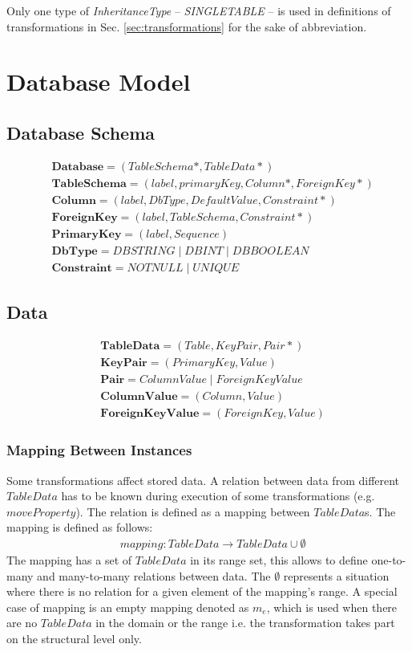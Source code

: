 \documentclass[10pt]{article}
\begin{document}
Only one type of \emph{InheritanceType} -- \emph{SINGLETABLE} -- is used in definitions of transformations in Sec. \ref{sec:transformations} for the sake of abbreviation. 


\section{Database Model}
\subsection{Database Schema}
\begin{align}
&	\mathbf{Database} = ( TableSchema*, TableData* )\\
&	\mathbf{TableSchema} = (label, primaryKey, Column*, ForeignKey*)\\
&	\mathbf{Column} = (label, DbType, DefaultValue, Constraint*) \\
&	\mathbf{ForeignKey} = (label, TableSchema, Constraint*) \\
&	\mathbf{PrimaryKey} =  ( label, Sequence ) \\
&	\mathbf{DbType} = DBSTRING \; | \; DBINT \; | \; DBBOOLEAN\\
&	\mathbf{Constraint} = NOTNULL \; | \; UNIQUE 
\end{align}

\subsection{Data}
\begin{align}
&	\mathbf{TableData} = (Table, KeyPair, Pair*) \\
&   \mathbf{KeyPair} = (PrimaryKey, Value) \\
&	\mathbf{Pair} = ColumnValue \; | \; ForeignKeyValue \\
&   \mathbf{ColumnValue} = (Column, Value) \\
&   \mathbf{ForeignKeyValue} = (ForeignKey, Value)
\end{align}

\subsubsection{Mapping Between Instances}
Some transformations affect stored data. A relation between data from different $TableData$ has to be known during execution of some transformations (e.g. $moveProperty$). The relation is defined as a mapping between $TableData$s. The mapping is defined as follows:
\begin{align}
& mapping: TableData \rightarrow TableData \cup \emptyset %
\end{align}
The mapping has a set of $TableData$ in its range set, this allows to define one-to-many and many-to-many relations between data. The $\emptyset$ represents a situation where there is no relation for a given element of the mapping's range. A special case of mapping is an empty mapping denoted as $m_e$, which is used when there are no $TableData$ in the domain or the range i.e. the transformation takes part on the structural level only.
\end{document}
